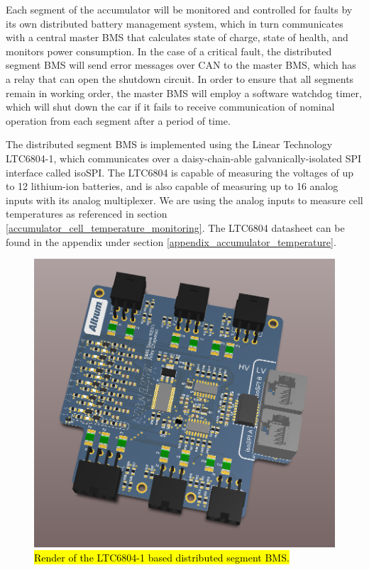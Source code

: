 \documentclass{article}
\begin{document}
Each segment of the accumulator will be monitored and controlled for faults by its own distributed battery management system, which in turn communicates with a central master BMS that calculates state of charge, state of health, and monitors power consumption. In the case of a critical fault, the distributed segment BMS will send error messages over CAN to the master BMS, which has a relay that can open the shutdown circuit. In order to ensure that all segments remain in working order, the master BMS will employ a software watchdog timer, which will shut down the car if it fails to receive communication of nominal operation from each segment after a period of time. 

The distributed segment BMS is implemented using the Linear Technology LTC6804-1, which communicates over a daisy-chain-able galvanically-isolated SPI interface called isoSPI. The LTC6804 is capable of measuring the voltages of up to 12 lithium-ion batteries, and is also capable of measuring up to 16 analog inputs with its analog multiplexer. We are using the analog inputs to measure cell temperatures as referenced in section \ref{accumulator_cell_temperature_monitoring}. The LTC6804 datasheet can be found in the appendix under section \ref{appendix_accumulator_temperature}. 

\begin{figure}[H]
    \centering
    \includegraphics[width=1\textwidth]{BMS_slave_iso}
    \caption{\hl{Render of the LTC6804-1 based distributed segment BMS.}}
    \label{fig:BMS_slave_iso}
\end{figure}
\end{document}
